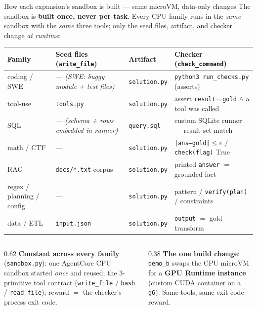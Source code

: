 \documentclass[aspectratio=169]{beamer}
\begin{document}
\begin{frame}[fragile]{How each expansion's sandbox is built --- same microVM, data-only changes}
  \footnotesize The sandbox is \textbf{built once, never per task}. Every CPU family runs in the
  \emph{same} sandbox with the \emph{same} three tools; only the seed files, artifact, and checker
  change \emph{at runtime}:
  \begin{center}
  \renewcommand{\arraystretch}{0.5}\scriptsize
  \begin{tabular}{@{}p{2.5cm}p{2.9cm}p{1.7cm}p{4.0cm}@{}}
    \toprule
    \textbf{Family} & \textbf{Seed files (\texttt{write\_file})} & \textbf{Artifact} & \textbf{Checker (\texttt{check\_command})} \\
    \midrule
    coding / SWE & --- \emph{(SWE: buggy module + test files)} & \texttt{solution.py} & \texttt{python3 run\_checks.py} (asserts) \\
    tool-use & \texttt{tools.py} & \texttt{solution.py} & assert \texttt{result==gold} $\wedge$ a tool was called \\
    SQL & --- \emph{(schema + rows embedded in runner)} & \texttt{query.sql} & custom SQLite runner --- result-set match \\
    math / CTF & --- & \texttt{solution.py} & \texttt{|ans--gold|}$\le\varepsilon$ / \texttt{check(flag)} True \\
    RAG & \texttt{docs/*.txt} corpus & \texttt{solution.py} & printed \texttt{answer} $=$ grounded fact \\
    regex / planning / config & --- & \texttt{solution.py} & pattern / \texttt{verify(plan)} / constraints \\
    data / ETL & \texttt{input.json} & \texttt{solution.py} & \texttt{output} $=$ gold transform \\
    \bottomrule
  \end{tabular}
  \end{center}
  \vspace{-0.7em}
  \begin{columns}[T]
    \begin{column}{0.62\textwidth}
      {\scriptsize\textbf{Constant across every family} (\texttt{sandbox.py}): one AgentCore CPU sandbox
      started \emph{once} and reused; the 3-primitive tool contract (\texttt{write\_file} / \texttt{bash}
      / \texttt{read\_file}); reward $=$ the checker's process exit code.}
    \end{column}
    \begin{column}{0.38\textwidth}
      {\scriptsize\textbf{The one build change}: \texttt{demo\_b} swaps the CPU microVM for a \textbf{GPU
      Runtime instance} (custom CUDA container on a \texttt{g6}). Same tools, same exit-code reward.}
    \end{column}
  \end{columns}
\end{frame}
\end{document}
